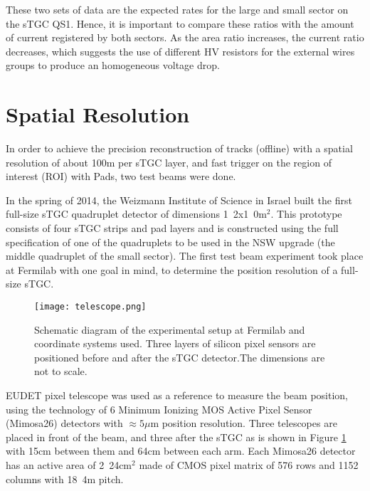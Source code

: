 These two sets of data are the expected rates for
the large and small sector on the sTGC QS1. Hence, it is important to compare these ratios with the amount of current
registered by both sectors. As the area ratio increases, the current ratio decreases, which suggests the use of different HV
resistors for the external wires groups to produce an homogeneous voltage drop. \par




\section{Spatial Resolution}\label{resolution}

In order to achieve the precision reconstruction of tracks (offline) with a spatial resolution of about
\unit{100}{\micro m} per sTGC layer, and fast trigger on the region of interest (ROI) with Pads, two test beams were
done.\par

In the spring of 2014, the Weizmann Institute of Science in Israel built the first full-size sTGC quadruplet detector of
dimensions \unit{1.2x1.0}{m$^2$}. This prototype consists of four sTGC strips and pad layers and is constructed using the
full specification of one of the quadruplets to be used in the NSW upgrade (the middle quadruplet of the small sector).
The first test beam experiment took place at Fermilab with one goal in mind, to determine the position resolution of a
full-size sTGC.\par

\begin{figure}[t]
\centering
\texttt{[image: telescope.png]}
\caption{\small Schematic diagram of
the experimental setup at Fermilab and coordinate systems used. Three layers of silicon pixel sensors are positioned
before and after the sTGC detector.The dimensions are not to scale.}\label{fig:telescope}
\end{figure}


EUDET pixel telescope was used as a reference to measure the beam position, using the technology of 6 Minimum Ionizing
MOS Active Pixel Sensor (Mimosa26) detectors with $\approx 5 \mu$m position resolution. Three telescopes are placed in
front of the beam, and three after the sTGC as is shown in Figure \ref{fig:telescope} with \unit{15}{cm} between them
and \unit{64}{cm} between each arm.  Each Mimosa26 detector has an active area of \unit{2.24}{cm$^2$} made of CMOS
pixel matrix of 576 rows and 1152 columns with \unit{18.4}{\micro m} pitch.\par


